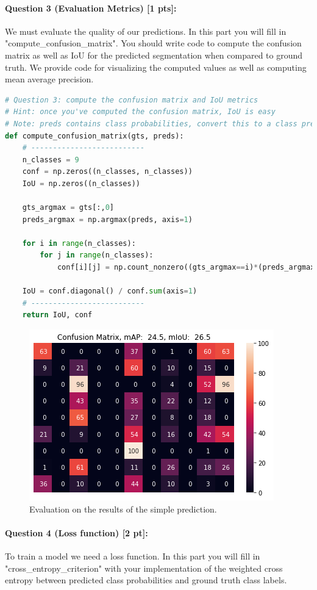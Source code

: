 \documentclass[11pt]{article}
\begin{document}
\paragraph{Question 3 (Evaluation Metrics) [1 pts]:}  
We must evaluate the quality of our predictions. In this part you will fill in "compute\_confusion\_matrix". You should write code to compute the confusion matrix as well as IoU for the predicted segmentation when compared to ground truth. We provide code for visualizing the computed values as well as computing mean average precision.

\begin{lstlisting}[language=Python, basicstyle=\scriptsize]
# Question 3: compute the confusion matrix and IoU metrics
# Hint: once you've computed the confusion matrix, IoU is easy
# Note: preds contains class probabilities, convert this to a class prediction
def compute_confusion_matrix(gts, preds):
    # --------------------------
    n_classes = 9
    conf = np.zeros((n_classes, n_classes))
    IoU = np.zeros((n_classes))
    
    gts_argmax = gts[:,0]
    preds_argmax = np.argmax(preds, axis=1)

    for i in range(n_classes):
        for j in range(n_classes):
            conf[i][j] = np.count_nonzero((gts_argmax==i)*(preds_argmax==j))
    
    IoU = conf.diagonal() / conf.sum(axis=1)
    # --------------------------
    return IoU, conf
\end{lstlisting}

\begin{figure}[h]
    \centering
    \includegraphics[width=0.5\linewidth]{eval_simple_predict.png}
    \caption{Evaluation on the results of the simple prediction.}
    \label{fig:eval-simple-predict}
\end{figure}

\paragraph{Question 4 (Loss function) [2 pt]:} 
To train a model we need a loss function. In this part you will fill in "cross\_entropy\_criterion" with your implementation of the weighted cross entropy between predicted class probabilities and ground truth class labels.
\end{document}
